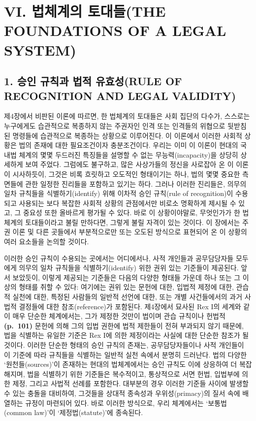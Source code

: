 \section{VI. 법체계의 토대들(THE FOUNDATIONS OF A LEGAL
SYSTEM)}\label{vi.-uxbc95uxccb4uxacc4uxc758-uxd1a0uxb300uxb4e4the-foundations-of-a-legal-system}

\subsection{1. 승인 규칙과 법적 유효성(RULE OF RECOGNITION AND LEGAL
VALIDITY)}\label{uxc2b9uxc778-uxaddcuxce59uxacfc-uxbc95uxc801-uxc720uxd6a8uxc131rule-of-recognition-and-legal-validity}

제4장에서 비판된 이론에 따르면, 한 법체계의 토대들은 사회 집단의 다수가,
스스로는 누구에게도 습관적으로 복종하지 않는 주권자인 인격 또는 인격들의
위협으로 뒷받침된 명령들에 습관적으로 복종하는 상황으로 이루어진다. 이
이론에서 이러한 사회적 상황은 법의 존재에 대한 필요조건이자
충분조건이다. 우리는 이미 이 이론이 현대의 국내법 체계의 몇몇 두드러진
특징들을 설명할 수 없는 무능력(incapacity)을 상당히 상세하게 보여
주었다. 그럼에도 불구하고, 많은 사상가들의 정신을 사로잡아 온 이 이론이
시사하듯이, 그것은 비록 흐릿하고 오도적인 형태이기는 하나, 법의 몇몇
중요한 측면들에 관한 일정한 진리들을 포함하고 있기는 하다. 그러나 이러한
진리들은, 의무의 일차 규칙들을 식별하기(identify) 위해 이차적 승인
규칙(rule of recognition)이 수용되고 사용되는 보다 복잡한 사회적 상황의
관점에서만 비로소 명확하게 제시될 수 있고, 그 중요성 또한 올바르게
평가될 수 있다. 바로 이 상황이야말로, 무엇인가가 한 법체계의
토대들이라고 불릴 만하다면, 그렇게 불릴 자격이 있는 것이다. 이 장에서는
주권 이론 및 다른 곳들에서 부분적으로만 또는 오도된 방식으로 표현되어 온
이 상황의 여러 요소들을 논의할 것이다.

이러한 승인 규칙이 수용되는 곳에서는 어디에서나, 사적 개인들과
공무담당자들 모두에게 의무의 일차 규칙들을 식별하기(identify) 위한 권위
있는 기준들이 제공된다. 앞서 보았듯이, 이렇게 제공되는 기준들은 다음의
다양한 형태들 가운데 하나 또는 그 이상의 형태를 취할 수 있다: 여기에는
권위 있는 문헌에 대한, 입법적 제정에 대한, 관습적 실천에 대한, 특정된
사람들의 일반적 선언에 대한, 또는 개별 사건들에서의 과거 사법적 결정들에
대한 참조(reference)가 포함된다. 제4장에서 묘사된 Rex I의 세계와 같이
매우 단순한 체계에서는, 그가 제정한 것만이 법이며 관습 규칙이나 헌법적
\textbf{(p.~101)} 문헌에 의해 그의 입법 권한에 법적 제한들이 전혀
부과되지 않기 때문에, 법을 식별하는 유일한 기준은 Rex I에 의한
제정이라는 사실에 대한 단순한 참조가 될 것이다. 이러한 단순한 형태의
승인 규칙의 존재는, 공무담당자들이나 사적 개인들이 이 기준에 따라
규칙들을 식별하는 일반적 실천 속에서 분명히 드러난다. 법의 다양한
‘원천들(sources)’이 존재하는 현대의 법체계에서는 승인 규칙도 이에
상응하여 더 복잡해지며, 법을 식별하기 위한 기준들은 복수적이고,
통상적으로 서면 헌법, 입법부에 의한 제정, 그리고 사법적 선례를 포함한다.
대부분의 경우 이러한 기준들 사이에 발생할 수 있는 충돌을 대비하여,
그것들을 상대적 종속성과 우위성(primacy)의 질서 속에 배열하는 규정이
마련되어 있다. 바로 이러한 방식으로, 우리 체계에서는 ‘보통법(common
law)’이 ‘제정법(statute)’에 종속된다.

